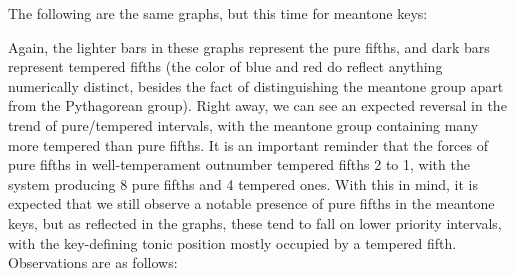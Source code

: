 The following are the same graphs, but this time for meantone keys:


    \begin{center}
    \end{center}
    
    Again, the lighter bars in these graphs represent the pure fifths, and
dark bars represent tempered fifths (the color of blue and red do
reflect anything numerically distinct, besides the fact of
distinguishing the meantone group apart from the Pythagorean group).
Right away, we can see an expected reversal in the trend of
pure/tempered intervals, with the meantone group containing many more
tempered than pure fifths. It is an important reminder that the forces
of pure fifths in well-temperament outnumber tempered fifths 2 to 1,
with the system producing 8 pure fifths and 4 tempered ones. With this
in mind, it is expected that we still observe a notable presence of pure
fifths in the meantone keys, but as reflected in the graphs, these tend
to fall on lower priority intervals, with the key-defining tonic
position mostly occupied by a tempered fifth. Observations are as
follows:

